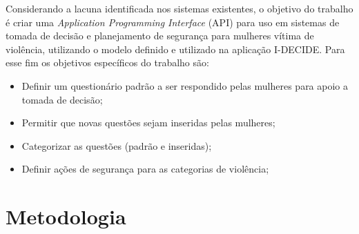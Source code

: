Considerando a lacuna identificada nos sistemas existentes, o objetivo do trabalho é 
criar uma \textit{Application Programming Interface} (API) para uso em sistemas de tomada de 
decisão e planejamento de segurança para mulheres vítima de violência, utilizando o modelo definido e utilizado na aplicação I-DECIDE.
Para esse fim os objetivos específicos do trabalho são:
\begin{itemize}
	\item Definir um questionário padrão a ser respondido pelas mulheres para apoio a tomada de decisão;
	\item Permitir que novas questões sejam inseridas pelas mulheres;
	\item Categorizar as questões (padrão e inseridas);
	\item Definir ações de segurança para as categorias de violência;
\end{itemize}

\section{Metodologia}








